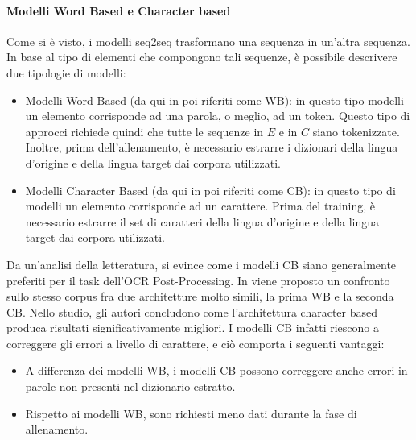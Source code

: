 \paragraph{Modelli Word Based e Character based} Come si è visto, i modelli seq2seq trasformano una sequenza in un'altra sequenza. In base al tipo di elementi che compongono tali sequenze, è possibile descrivere due tipologie di modelli:
\begin{itemize}
\item Modelli Word Based (da qui in poi riferiti come WB): in questo tipo modelli un elemento corrisponde ad una parola, o meglio, ad un token. Questo tipo di approcci richiede quindi che tutte le sequenze in $E$ e in $C$ siano tokenizzate. Inoltre, prima dell'allenamento, è necessario estrarre i dizionari della lingua d'origine e della lingua target dai corpora utilizzati.
\item Modelli Character Based (da qui in poi riferiti come CB): in questo tipo di modelli un elemento corrisponde ad un carattere. Prima del training, è necessario estrarre il set di caratteri della lingua d'origine e della lingua target dai corpora utilizzati.
\end{itemize}
Da un'analisi della letteratura, si evince come i modelli CB siano generalmente preferiti per il task dell'OCR Post-Processing\cite{mokhtar2018ocr,hamalainen2019paft,nguyen2020neural,
nastase2018correction,duong2020unsupervised,amrhein2018supervised}.
In \cite{mokhtar2018ocr} viene proposto un confronto sullo stesso corpus fra due architetture molto simili, la prima WB e la seconda CB. Nello studio, gli autori concludono come l'architettura character based produca risultati significativamente migliori. I modelli CB infatti riescono a correggere gli errori a livello di carattere, e ciò comporta i seguenti vantaggi:
\begin{itemize}
\item A differenza dei modelli WB, i modelli CB possono correggere anche errori in parole non presenti nel dizionario estratto.
\item Rispetto ai modelli WB, sono richiesti meno dati durante la fase di allenamento.
\end{itemize}


